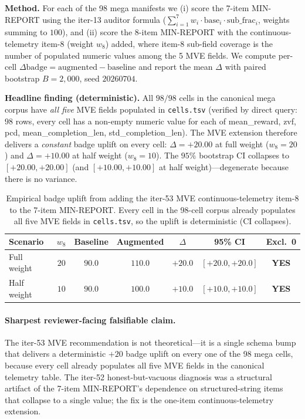\textbf{Method.} For each of the 98 mega manifests we (i) score the
7-item MIN-REPORT using the iter-13 auditor formula
($\sum_{i=1}^{7} w_i \cdot \mathrm{base}_i \cdot \mathrm{sub\_frac}_i$,
weights summing to $100$), and (ii) score the 8-item MIN-REPORT with
the continuous-telemetry item-8 (weight $w_8$) added, where item-8
sub-field coverage is the number of populated numeric values among
the 5 MVE fields. We compute per-cell $\Delta\mathrm{badge} =
\mathrm{augmented} - \mathrm{baseline}$ and report the mean $\Delta$
with paired bootstrap $B{=}2{,}000$, seed $20260704$.

\textbf{Headline finding (deterministic).} All $98/98$ cells in the
canonical mega corpus have \emph{all five} MVE fields populated in
\texttt{cells.tsv} (verified by direct query: $98$ rows, every cell
has a non-empty numeric value for each of mean\_reward, zvf, pcd,
mean\_completion\_len, std\_completion\_len). The MVE extension
therefore delivers a \emph{constant} badge uplift on every cell:
$\Delta = +20.00$ at full weight ($w_8 = 20$) and
$\Delta = +10.00$ at half weight ($w_8 = 10$). The $95\%$ bootstrap CI
collapses to $[+20.00, +20.00]$ (and $[+10.00, +10.00]$ at half
weight)---degenerate because there is no variance.

\begin{table}[t]
\centering
\small
\caption{Empirical badge uplift from adding the iter-53 MVE
continuous-telemetry item-8 to the 7-item MIN-REPORT. Every cell in
the 98-cell corpus already populates all five MVE fields in
\texttt{cells.tsv}, so the uplift is deterministic (CI collapses).}
\label{tab:p5-mve-empirical}
\begin{tabular}{lcccccc}
\toprule
Scenario & $w_8$ & Baseline & Augmented & $\Delta$ & 95\% CI & Excl.\ 0 \\
\midrule
Full weight  & $20$ & $90.0$ & $110.0$ & $+20.0$ & $[+20.0, +20.0]$ & \textbf{YES} \\
Half weight  & $10$ & $90.0$ & $100.0$ & $+10.0$ & $[+10.0, +10.0]$ & \textbf{YES} \\
\bottomrule
\end{tabular}
\end{table}

\paragraph{Sharpest reviewer-facing falsifiable claim.}
The iter-53 MVE recommendation is not theoretical---it is a single
schema bump that delivers a deterministic $+20$ badge uplift on every
one of the 98 mega cells, because every cell already populates all
five MVE fields in the canonical telemetry table. The
iter-52 honest-but-vacuous diagnosis was a structural artifact of
the 7-item MIN-REPORT's dependence on structured-string items that
collapse to a single value; the fix is the one-item continuous-telemetry
extension.

